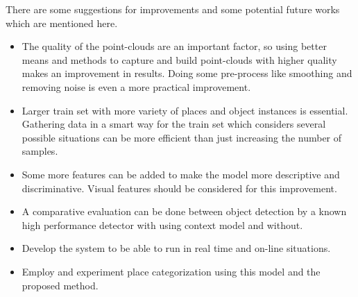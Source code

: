 There are some suggestions for improvements and some potential future works which are mentioned here.
\begin{itemize}
 \item The quality of the point-clouds are an important factor, so using better means and methods to capture and build 
 point-clouds with higher quality makes an improvement in results. Doing some pre-process like smoothing and removing noise
 is even a more practical improvement.
 \item Larger train set with more variety of places and object instances is essential. Gathering data in a smart way
  for the train set which considers several possible situations can be more efficient than just increasing the number of samples.
 \item Some more features can be added to make the model more descriptive and discriminative. 
  Visual features should be considered for this improvement.
 \item A comparative evaluation can be done between object detection by a known high performance detector with using context model
  and without.
 \item Develop the system to be able to run in real time and on-line situations.
 \item Employ and experiment place categorization using this model and the proposed method.
\end{itemize} 
